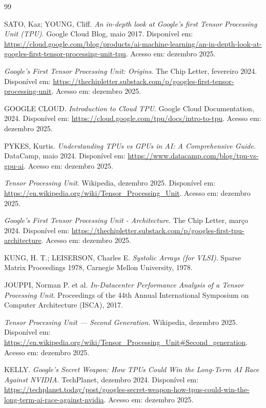 \documentclass[12pt,a4paper]{article}
\begin{document}
\begin{thebibliography}{99}

SATO, Kaz; YOUNG, Cliff.
\textit{An in-depth look at Google's first Tensor Processing Unit (TPU)}.
Google Cloud Blog, maio 2017.
Disponível em: \url{https://cloud.google.com/blog/products/ai-machine-learning/an-in-depth-look-at-googles-first-tensor-processing-unit-tpu}.
Acesso em: dezembro 2025.

\textit{Google's First Tensor Processing Unit: Origins}.
The Chip Letter, fevereiro 2024.
Disponível em: \url{https://thechipletter.substack.com/p/googles-first-tensor-processing-unit}.
Acesso em: dezembro 2025.

GOOGLE CLOUD.
\textit{Introduction to Cloud TPU}.
Google Cloud Documentation, 2024.
Disponível em: \url{https://cloud.google.com/tpu/docs/intro-to-tpu}.
Acesso em: dezembro 2025.

PYKES, Kurtis. 
\textit{Understanding TPUs vs GPUs in AI: A Comprehensive Guide}.
DataCamp, maio 2024.
Disponível em: \url{https://www.datacamp.com/blog/tpu-vs-gpu-ai}.
Acesso em: dezembro 2025.

\textit{Tensor Processing Unit}.
Wikipedia, dezembro 2025.
Disponível em: \url{https://en.wikipedia.org/wiki/Tensor_Processing_Unit}.
Acesso em: dezembro 2025.

\textit{Google's First Tensor Processing Unit - Architecture}.
The Chip Letter, março 2024.
Disponível em: \url{https://thechipletter.substack.com/p/googles-first-tpu-architecture}.
Acesso em: dezembro 2025.

KUNG, H. T.; LEISERSON, Charles E.
\textit{Systolic Arrays (for VLSI)}.
Sparse Matrix Proceedings 1978, Carnegie Mellon University, 1978.

JOUPPI, Norman P. et al.
\textit{In-Datacenter Performance Analysis of a Tensor Processing Unit}.
Proceedings of the 44th Annual International Symposium on Computer Architecture (ISCA), 2017.

\textit{Tensor Processing Unit --- Second Generation}.
Wikipedia, dezembro 2025.
Disponível em: \url{https://en.wikipedia.org/wiki/Tensor_Processing_Unit#Second_generation}.
Acesso em: dezembro 2025.

KELLY.
\textit{Google's Secret Weapon: How TPUs Could Win the Long-Term AI Race Against NVIDIA}.
TechPlanet, dezembro 2024.
Disponível em: \url{https://techplanet.today/post/googles-secret-weapon-how-tpus-could-win-the-long-term-ai-race-against-nvidia}.
Acesso em: dezembro 2025.


\end{thebibliography}
\end{document}
